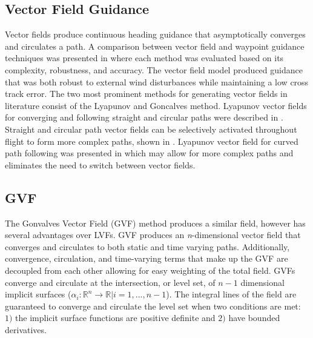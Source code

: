 \documentclass[conf]{new-aiaa}
\begin{document}
\subsection{Vector Field Guidance}

 Vector fields produce continuous heading guidance that asymptotically converges and circulates a path. A comparison between vector field and waypoint guidance techniques was presented in \cite{sujit_unmanned_2014} where each method was evaluated based on its complexity, robustness, and accuracy. The vector field model produced guidance that was both robust to external wind disturbances while maintaining a low cross track error. The two most prominent methods for generating vector fields in literature consist of the Lyapunov \cite{nelson_cooperative_2005,nelson_vector_2006,nelson_vector_2007,frew_cooperative_2007,miao_orthogonal_2016,griffiths_vector_2006} and Goncalves \cite{goncalves_artificial_2009,goncalves_circulation_2010,goncalves_vector_2010,gerlach_autonomous_2014} method. Lyapunov vector fields for converging and following straight and circular paths were described in \cite{nelson_cooperative_2005}. Straight and circular path vector fields can be selectively activated throughout flight to form more complex paths, shown in \cite{nelson_cooperative_2005,nelson_vector_2006,nelson_vector_2007,jung_unmanned_2016}. Lyapunov vector field for curved path following was presented in \cite{griffiths_vector_2006} which may allow for more complex paths and eliminates the need to switch between vector fields. \\

\subsection{GVF}
The Gonvalves Vector Field (GVF) method produces a similar field, however has several advantages over LVFs. GVF produces an \textit{n}-dimensional vector field that converges and circulates to both static and time varying paths. Additionally, convergence, circulation, and time-varying terms that make up the GVF are decoupled from each other allowing for easy weighting of the total field. GVFs converge and circulate at the intersection, or level set, of $n-1$ dimensional implicit surfaces ($\alpha_i:\mathbb{R}^n\rightarrow\mathbb{R} | i=1,...,n-1$). The integral lines of the field are guaranteed to converge and circulate the level set when two conditions are met: $1)$ the implicit surface functions are positive definite and $2)$ have bounded derivatives. %
\end{document}
